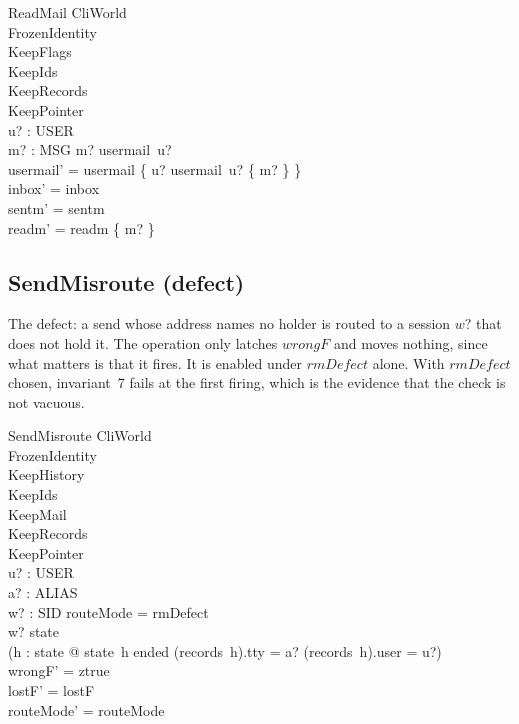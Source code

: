 \documentclass[a4paper,10pt,fleqn]{article}
\begin{document}
\begin{schema}{ReadMail}
  \Delta CliWorld \\
  FrozenIdentity \\
  KeepFlags \\
  KeepIds \\
  KeepRecords \\
  KeepPointer \\
  u? : USER \\
  m? : MSG
  \where
  m? \in usermail~u? \\
  usermail' = usermail \oplus
    \{ u? \mapsto usermail~u? \setminus \{ m? \} \} \\
  inbox' = inbox \\
  sentm' = sentm \\
  readm' = readm \cup \{ m? \}
\end{schema}

\subsection{SendMisroute (defect)}

The defect: a send whose address names no holder is routed to a session
$w?$ that does not hold it.  The operation only latches $wrongF$ and
moves nothing, since what matters is that it fires.  It is enabled
under $rmDefect$ alone.  With $rmDefect$ chosen, invariant~7 fails at
the first firing, which is the evidence that the check is not vacuous.

\begin{schema}{SendMisroute}
  \Delta CliWorld \\
  FrozenIdentity \\
  KeepHistory \\
  KeepIds \\
  KeepMail \\
  KeepRecords \\
  KeepPointer \\
  u? : USER \\
  a? : ALIAS \\
  w? : SID
  \where
  routeMode = rmDefect \\
  w? \in \dom state \\
  \lnot (\exists h : \dom state @
    state~h \neq ended
      \land (records~h).tty = a?
      \land (records~h).user = u?) \\
  wrongF' = ztrue \\
  lostF' = lostF \\
  routeMode' = routeMode
\end{schema}
\end{document}
